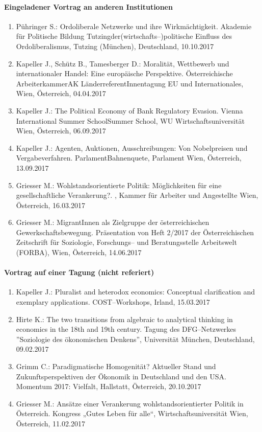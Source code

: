 \paragraph{Eingeladener Vortrag an anderen Institutionen}
\begin{enumerate}
	\item Pühringer S.: Ordoliberale Netzwerke und ihre Wirkmächtigkeit. Akademie für Politische Bildung Tutzingder(wirtschafts--)politische Einfluss des Ordoliberalismus, Tutzing (München), Deutschland, 10.10.2017
	\item Kapeller J., Schütz B., Tamesberger D.: Moralität, Wettbewerb und internationaler Handel: Eine europäische Perspektive. Österreichische ArbeiterkammerAK LänderreferentInnentagung EU und Internationales, Wien, Österreich, 04.04.2017
	\item Kapeller J.: The Political Economy of Bank Regulatory Evasion. Vienna International Summer SchoolSummer School, WU Wirtschaftsuniversität Wien, Österreich, 06.09.2017
	\item Kapeller J.: Agenten, Auktionen, Ausschreibungen: Von Nobelpreisen und Vergabeverfahren. ParlamentBahnenquete, Parlament Wien, Österreich, 13.09.2017
	\item Griesser M.: Wohlstandsorientierte Politik: Möglichkeiten für eine gesellschaftliche Verankerung?. , Kammer für Arbeiter und Angestellte Wien, Österreich, 16.03.2017
	\item Griesser M.: MigrantInnen als Zielgruppe der österreichischen Gewerkschaftsbewegung. Präsentation von Heft 2/2017 der Österreichischen Zeitschrift für Soziologie, Forschungs-- und Beratungsstelle Arbeitswelt (FORBA), Wien, Österreich, 14.06.2017
\end{enumerate}
\paragraph{Vortrag auf einer Tagung (nicht referiert)}
\begin{enumerate}
	\item Kapeller J.: Pluralist and heterodox economics: Conceptual clarification and exemplary applications. COST--Workshops, Irland, 15.03.2017
	\item Hirte K.: The two transitions from algebraic to analytical thinking in economics in the 18th and 19th century. Tagung des DFG--Netzwerkes ''Soziologie des ökonomischen Denkens'', Universität München, Deutschland, 09.02.2017
	\item Grimm C.: Paradigmatische Homogenität? Aktueller Stand und  Zukunftsperspektiven der Ökonomik in Deutschland und den USA. Momentum 2017: Vielfalt, Hallstatt, Österreich, 20.10.2017
	\item Griesser M.: Ansätze einer Verankerung wohlstandsorientierter Politik in Österreich. Kongress „Gutes Leben für alle“, Wirtschaftsuniversität Wien, Österreich, 11.02.2017
\end{enumerate}
